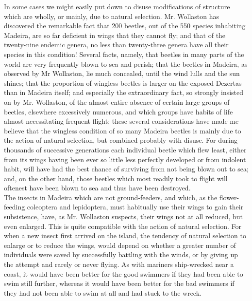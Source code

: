 \indent In some cases we might easily put down to disuse modifications of structure which are wholly, or mainly, due to natural selection. Mr. Wollaston has discovered the remarkable fact that 200 beetles, out of the 550 species inhabiting Madeira, are so far deficient in wings that they cannot fly; and that of the twenty-nine endemic genera, no less than twenty-three genera have all their species in this condition! Several facts, namely, that beetles in many parts of the world are very frequently blown to sea and perish; that the beetles in Madeira, as observed by Mr Wollaston, lie much concealed, until the wind lulls and the sun shines; that the proportion of wingless beetles is larger on the exposed Dezertas than in Madeira itself; and especially the extraordinary fact, so strongly insisted on by Mr. Wollaston, of the almost entire absence of certain large groups of beetles, elsewhere excessively numerous, and which groups have habits of life almost necessitating frequent flight; these several considerations have made me believe that the wingless condition of so many Madeira beetles is mainly due to the action of natural selection, but combined probably with disuse. For during thousands of successive generations each individual beetle which flew least, either from its wings having been ever so little less perfectly developed or from indolent habit, will have had the best chance of surviving from not being blown out to sea; and, on the other hand, those beetles which most readily took to flight will oftenest have been blown to sea and thus have been destroyed.\\
\indent The insects in Madeira which are not ground-feeders, and which, as the flower-feeding coleoptera and lepidoptera, must habitually use their wings to gain their subsistence, have, as Mr. Wollaston suspects, their wings not at all reduced, but even enlarged. This is quite compatible with the action of natural selection. For when a new insect first arrived on the island, the tendency of natural selection to enlarge or to reduce the wings, would depend on whether a greater number of individuals were saved by successfully battling with the winds, or by giving up the attempt and rarely or never flying. As with mariners ship-wrecked near a coast, it would have been better for the good swimmers if they had been able to swim still further, whereas it would have been better for the bad swimmers if they had not been able to swim at all and had stuck to the wreck.\\
